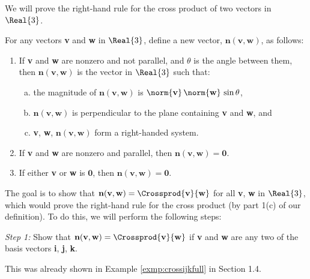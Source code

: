 We will prove the right-hand rule for the cross product of two vectors in $\Real{3}$.\\

\par\noindent For any vectors \textbf{v} and \textbf{w} in $\Real{3}$, define a new vector,
$\textbf{n}(\textbf{v},\textbf{w})$, as follows:
\begin{enumerate}
 \item If \textbf{v} and \textbf{w} are nonzero and not parallel, and $\theta$ is the angle between them, then
  $\textbf{n}(\textbf{v},\textbf{w})$ is the vector in $\Real{3}$ such that:
  \begin{enumerate}[(a)]
   \item the magnitude of $\textbf{n}(\textbf{v},\textbf{w})$ is $\norm{\textbf{v}}\,\norm{\textbf{w}}\,\sin \theta$,
   \item $\textbf{n}(\textbf{v},\textbf{w})$ is perpendicular to the plane containing \textbf{v} and \textbf{w}, and
   \item \textbf{v}, \textbf{w}, $\textbf{n}(\textbf{v},\textbf{w})$ form a right-handed system.
  \end{enumerate}
 \item If \textbf{v} and \textbf{w} are nonzero and parallel, then $\textbf{n}(\textbf{v},\textbf{w}) = \textbf{0}$.
 \item If either \textbf{v} or \textbf{w} is $\textbf{0}$, then $\textbf{n}(\textbf{v},\textbf{w}) = \textbf{0}$.
\end{enumerate}
The goal is to show that $\textbf{n}(\textbf{v},\textbf{w}) = \Crossprod{\textbf{v}}{\textbf{w}}$ for all
\textbf{v}, \textbf{w} in $\Real{3}$, which would prove the right-hand rule for the cross product (by part 1(c) of
our definition). To do this, we will perform the following steps:\\

\par\noindent \emph{Step 1:} Show that $\textbf{n}(\textbf{v},\textbf{w}) = \Crossprod{\textbf{v}}{\textbf{w}}$ if
\textbf{v} and \textbf{w} are any two of the basis vectors \textbf{i}, \textbf{j}, \textbf{k}.\vspace{1mm}
\par\noindent This was already shown in Example \ref{exmp:crossijkfull} in Section 1.4.\enskip\checkmark\\


